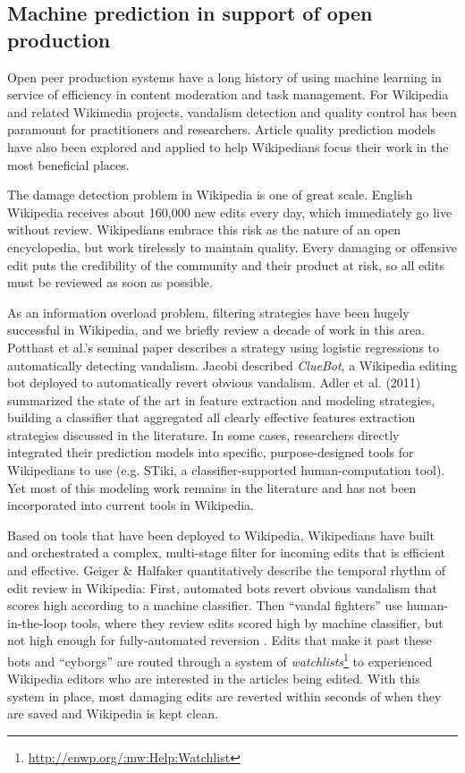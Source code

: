 \subsection{Machine prediction in support of open production}
Open peer production systems have a long history of using machine learning in service of efficiency in content moderation and task management. For Wikipedia and related Wikimedia projects, vandalism detection and quality control has been paramount for practitioners and researchers.  Article quality prediction models have also been explored and applied to help Wikipedians focus their work in the most beneficial places.

 The damage detection problem in Wikipedia is one of great scale.  English Wikipedia receives about 160,000 new edits every day, which immediately go live without review.  Wikipedians embrace this risk as the nature of an open encyclopedia, but work tirelessly to maintain quality. Every damaging or offensive edit puts the credibility of the community and their product at risk, so all edits must be reviewed as soon as possible.

As an information overload problem, filtering strategies have been hugely successful in Wikipedia, and we briefly review a decade of work in this area. Potthast et al.'s seminal paper\cite{potthast2008automatic} describes a strategy using logistic regressions to automatically detecting vandalism. Jacobi described \emph{ClueBot}\cite{carter2008cluebot}, a Wikipedia editing bot deployed to automatically revert obvious vandalism. Adler et al. (2011) summarized the state of the art in feature extraction and modeling strategies, building a classifier that aggregated all clearly effective features extraction strategies discussed in the literature\cite{adler2011wikipedia}.  In some cases, researchers directly integrated their prediction models into specific, purpose-designed tools for Wikipedians to use (e.g. STiki\cite{west2010stiki}, a classifier-supported human-computation tool). Yet most of this modeling work remains in the literature and has not been incorporated into current tools in Wikipedia.

Based on tools that have been deployed to Wikipedia, Wikipedians have built and orchestrated a complex, multi-stage filter for incoming edits that is efficient and effective.  Geiger \& Halfaker quantitatively describe the temporal rhythm of edit review in Wikipedia\cite{geiger2013levee}: First, automated bots revert obvious vandalism that scores high according to a machine classifier. Then ``vandal fighters'' use human-in-the-loop tools, where they review edits scored high by machine classifier, but not high enough for fully-automated reversion \cite{geiger2010work}.  Edits that make it past these bots and ``cyborgs''\cite{halfaker2012bots} are routed through a system of \emph{watchlists}\footnote{\url{http://enwp.org/:mw:Help:Watchlist}} to experienced Wikipedia editors who are interested in the articles being edited.  With this system in place, most damaging edits are reverted within seconds of when they are saved\cite{geiger2013levee} and Wikipedia is kept clean.

